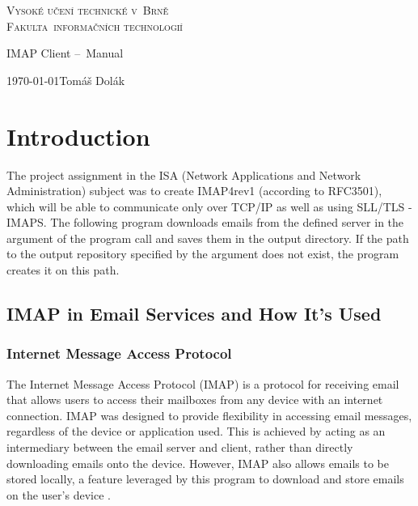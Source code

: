 \documentclass[a4paper,11pt]{article}
\begin{document}
\begin{titlepage}
    \begin{center}
        
        \Huge
        \textsc{Vysoké učení technické v~Brně}\\[0.1em]
        
        \huge
        \textsc{Fakulta~informačních technologií}
        
        
        \LARGE
        IMAP Client --\ Manual \\[-0.1em]

    \end{center}
    
    {\Large \today \hfill Tomáš Dolák}
\end{titlepage}

\newpage
\tableofcontents

\newpage
\label{firstpage}
\section{Introduction}
The project assignment in the ISA (Network Applications and Network Administration) subject was 
to create IMAP4rev1 (according to RFC3501), which will be able to communicate only over TCP/IP as well 
as using SLL/TLS - IMAPS. The following program downloads emails from the defined server in the argument 
of the program call and saves them in the output directory. If the path to the output repository 
specified by the argument does not exist, the program creates it on this path.

\subsection{IMAP in Email Services and How It's Used}

\subsubsection{Internet Message Access Protocol}
The Internet Message Access Protocol (IMAP) is a protocol for receiving email that allows users to access 
their mailboxes from any device with an internet connection. IMAP was designed to provide flexibility in 
accessing email messages, regardless of the device or application used. This is achieved by acting as an 
intermediary between the email server and client, rather than directly downloading emails onto the device. 
However, IMAP also allows emails to be stored locally, a feature leveraged by this program to download 
and store emails on the user’s device \cite{rfc3501, what_is_imap}.
\end{document}

